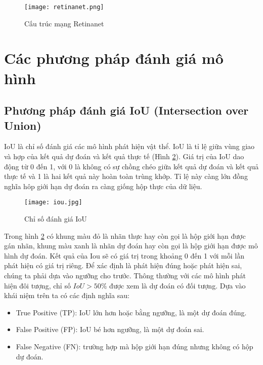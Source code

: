\documentclass[../the.tex]{subfiles}
\begin{document}
\begin{figure}[H]
	\centering
	\texttt{[image: retinanet.png]}
	\caption{Cấu trúc mạng Retinanet \cite{lin2018focal}}
	\label{fig:retinanet}
\end{figure}

\section{Các phương pháp đánh giá mô hình}

\subsection{Phương pháp đánh giá IoU (Intersection over Union)}

{\fontsize{13}{12} \selectfont
	IoU là chỉ số đánh giá các mô hình phát hiện vật thể. IoU là tỉ lệ giữa vùng giao và hợp của kết quả dự đoán và kết quả thực tế (Hình \ref{fig:iou}).
	Giá trị của IoU dao động
	từ 0 đến 1, với 0 là không có sự chồng chéo giữa kết quả dự đoán và kết quả
	thực tế và 1 là hai kết quả này hoàn toàn trùng khớp.
	Tỉ lệ này càng lớn đồng nghĩa hôp giới hạn dự đoán ra càng giống hộp thực của dữ liệu.
}

\begin{figure}[H]
	\centering
	\texttt{[image: iou.jpg]}
	\caption{Chỉ số đánh giá IoU}
	\label{fig:iou}
\end{figure}

{\fontsize{13}{12} \selectfont
	Trong hình \ref{fig:iou} có khung màu đỏ là nhãn thực hay còn gọi là hộp giới hạn
	được gán nhãn, khung màu xanh là nhãn dự đoán hay còn gọi là hộp giới hạn được mô hình dự đoán.
	Kết quả của Iou sẽ có giá trị trong khoảng 0 đến 1 với mỗi lần phát hiện có giá trị riêng. Để xác định là phát hiện đúng hoặc phát hiện sai, chúng ta phải dựa vào ngưỡng cho trước.
	Thông thường với các mô hình phát hiện đôi tượng, chỉ số $IoU > 50\%$ được xem là dự đoán có đối tượng. Dựa vào khái niệm trên ta có các định nghĩa sau:
	\begin{itemize}
		\item True Positive (TP): IoU lớn hơn hoặc bằng ngưỡng, là một dự đoán đúng.
		\item False Positive (FP): IoU bé hơn ngưỡng, là một dự đoán sai.
		\item False Negative (FN): trường hợp mà hộp giới hạn đúng nhưng không có hộp dự đoán.
	\end{itemize}
}
\end{document}
